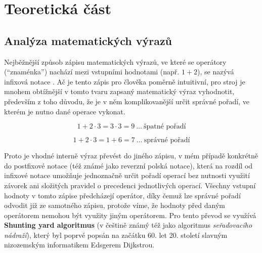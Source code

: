 \documentclass[12pt]{report}
\begin{document}
\chapter{Teoretická část}



\section{Analýza matematických
výrazů}

Nejběžnější způsob zápisu matematických výrazů, ve které se operátory
(``znaménka'') nachází mezi vstupními hodnotami (např. \(1+2\)), se
nazývá infixová notace \supercite{wiki:infixova_notace}. Ač je tento zápis pro člověka poměrně
intuitivní, pro stroj je mnohem obtížnější v tomto tvaru zapsaný
matematický výraz vyhodnotit, především z toho důvodu, že je v něm
komplikovanější určit správné pořadí, ve kterém je nutno dané operace
vykonat.

$$ 
1 + 2 \cdot 3 = 3 \cdot 3 = 9 \ \dots\ \text{špatné pořadí} 
$$

$$ 
1 + 2 \cdot 3 = 1 + 6 = 7 \ \dots\ \text{správné pořadí} 
$$


Proto je vhodné interně výraz převést do jiného zápisu, v mém případě
konkrétně do postfixové notace (též známé jako reverzní polská notace),
která na rozdíl od infixové notace umožňuje jednoznačně určit pořadí
operací bez nutnosti využití závorek ani složitých pravidel o precedenci
jednotlivých operací. Všechny vstupní hodnoty v tomto zápise předcházejí
operátor, díky čemuž lze správné pořadí odvodit již ze samotného
zápisu, protože víme, že hodnoty před daným operátorem nemohou být
využity jiným operátorem. Pro tento převod se využívá \textbf{Shunting
yard algoritmus}\supercite{brilliantShuntingYard} (v češtině známý též jako algoritmus \textit{seřaďovacího nádraží})\supercite{wiki:shunting_yard}, který byl poprvé popsán na začátku 60. let 20. století
slavným nizozemským informatikem Edsgerem Dijkstrou.\supercite{wiki:shunting_yard}
\end{document}
